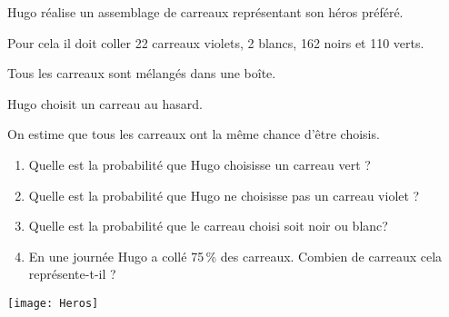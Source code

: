 
\medskip

\parbox{0.8\linewidth}{Hugo réalise un assemblage de carreaux représentant son héros préféré. 

Pour cela il doit coller 22 carreaux violets, 2 blancs, 162 noirs et 110 verts.

Tous les carreaux sont mélangés dans une boîte.

Hugo choisit un carreau au hasard.

On estime que tous les carreaux ont la même chance d'être choisis.

\medskip
\begin{enumerate}
\item Quelle est la probabilité que Hugo choisisse un carreau vert ?
\item  Quelle est la probabilité que Hugo ne choisisse pas un carreau violet ?
\item  Quelle est la probabilité que le carreau choisi soit noir ou blanc?
\item  En une journée Hugo a collé 75\,\% des carreaux. Combien de carreaux cela représente-t-il ?
\end{enumerate}} \hfill \parbox{0.18\linewidth}{\texttt{[image: Heros]}}


